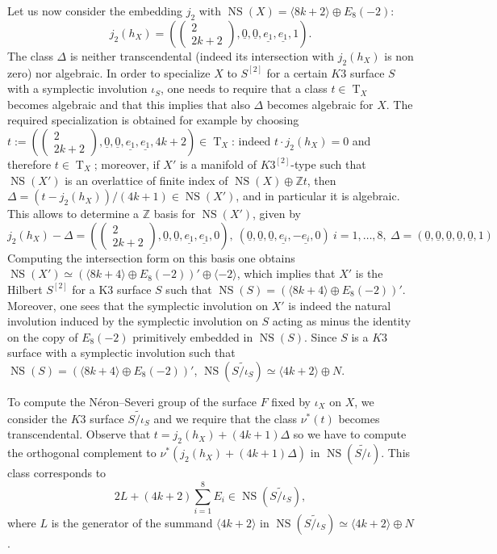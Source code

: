 \documentclass{amsart}
\theoremstyle{definition}
\numberwithin{equation}{section}
\numberwithin{equation}{section} \theoremstyle{definition}
\DeclareMathOperator{\NS}{NS}
\DeclareMathOperator{\T}{T}
\newcommand\Z{\mathbb{Z}}
\begin{document}
Let us now consider the embedding $j_2$ with $\NS(X)=\langle 8k+2\rangle\oplus E_8(-2)$:
$$j_2(h_X)=\left(\left(\begin{array}{c}2\\2k+2\end{array}\right),\underline{0},\underline{0},\underline{e_1},\underline{e_1},1\right).$$ The class $\Delta$ is neither transcendental (indeed its intersection with $j_2(h_X)$ is non zero) nor algebraic. In order to specialize $X$ to $S^{[2]}$ for a certain $K3$ surface $S$ with a symplectic involution $\iota_S$, one needs to require that a class $t\in \T_X$ becomes algebraic and that this implies that also $\Delta$ becomes algebraic for $X$. 
The required specialization is obtained for example by choosing $t:=\left(\left(\begin{array}{c}2\\2k+2\end{array}\right),\underline{0},\underline{0},\underline{e_1},\underline{e_1},4k+2\right)\in \T_X$: indeed $t\cdot j_2(h_X)=0$ and therefore $t\in \T_X$; moreover, if $X'$ is a  manifold of $K3^{[2]}$-type such that $\NS(X')$ is an overlattice of finite index of $\NS(X)\oplus \Z t$, then $\Delta=(t-j_2(h_X))/(4k+1)\in \NS(X')$, and in particular it is algebraic. This allows to determine a $\Z$ basis for $\NS(X')$, given by $$j_2(h_X)-\Delta=\left(\left(\begin{array}{c}2\\2k+2\end{array}\right),\underline{0},\underline{0},\underline{e_1},\underline{e_1},0\right),\ 
\left(\underline{0},\underline{0},\underline{0},\underline{e_i},-\underline{e_i},0\right)\ {i=1,\ldots, 8},\ \Delta=\left(\underline{0},\underline{0},\underline{0},\underline{0},\underline{0},1\right)$$ Computing the intersection form on this basis one obtains $\NS(X')\simeq (\langle 8k+4\rangle\oplus E_8(-2))'\oplus \langle -2\rangle$, which implies that $X'$ is the Hilbert $S^{[2]}$ for a K3 surface $S$ such that $\NS(S)=\left(\langle 8k+4\rangle\oplus E_8(-2)\right)'$. Moreover, one sees that the symplectic involution on $X'$ is indeed the natural involution induced by the symplectic involution on $S$ acting as minus the identity on the copy of $E_8(-2)$ primitively embedded in $\NS(S)$.
Since $S$ is a $K3$ surface with a symplectic involution such that $\NS(S)=\left(\langle 8k+4\rangle\oplus E_8(-2)\right)'$, $\NS(\widetilde{S/\iota_S})\simeq \langle 4k+2\rangle\oplus N$.

To compute the N\'eron--Severi group of the surface $F$ fixed by $\iota_X$ on $X$, we consider the $K3$ surface $\widetilde{S/\iota_S}$ and we require that the class $\nu^*(t)$ becomes transcendental. Observe that $t=j_2(h_X)+(4k+1)\Delta$ so we have to compute the orthogonal complement to $\nu^*(j_2(h_X)+(4k+1)\Delta)$ in $\NS(\widetilde{S/\iota})$. This class corresponds to $$2L+(4k+2)\sum_{i=1}^8E_i\in \NS(\widetilde{S/\iota_S}),$$ where $L$ is the generator of the summand $\langle 4k+2\rangle$ in $\NS(\widetilde{S/\iota_S})\simeq \langle 4k+2\rangle\oplus N$.
\end{document}
